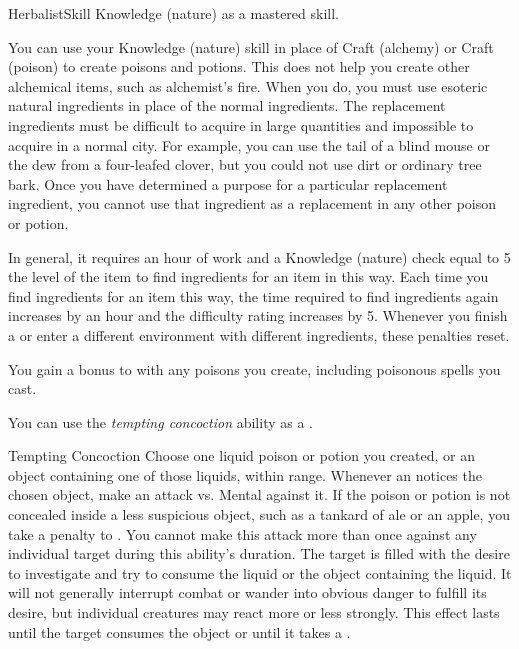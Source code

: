     \begin{feat}{Herbalist}{Skill}
        \featpre Knowledge (nature) as a mastered skill.

         You can use your Knowledge (nature) skill in place of Craft (alchemy) or Craft (poison) to create poisons and potions.
        This does not help you create other alchemical items, such as alchemist's fire.
        When you do, you must use esoteric natural ingredients in place of the normal ingredients.
        The replacement ingredients must be difficult to acquire in large quantities and impossible to acquire in a normal city.
        For example, you can use the tail of a blind mouse or the dew from a four-leafed clover, but you could not use dirt or ordinary tree bark.
        Once you have determined a purpose for a particular replacement ingredient, you cannot use that ingredient as a replacement in any other poison or potion.

        In general, it requires an hour of work and a Knowledge (nature) check equal to 5 \add the level of the item to find ingredients for an item in this way.
        Each time you find ingredients for an item this way, the time required to find ingredients again increases by an hour and the difficulty rating increases by 5.
        Whenever you finish a  or enter a different environment with different ingredients, these penalties reset.

         You gain a  bonus to  with any poisons you create, including poisonous spells you cast.

         You can use the \textit{tempting concoction} ability as a .
        \begin{attuneability}{Tempting Concoction}
            \rankline
            Choose one liquid poison or potion you created, or an object containing one of those liquids, within \rngshort range.
            Whenever an  notices the chosen object, make an attack vs. Mental against it.
            If the poison or potion is not concealed inside a less suspicious object, such as a tankard of ale or an apple, you take a  penalty to .
            You cannot make this attack more than once against any individual target during this ability's duration.
            \hit The target is filled with the desire to investigate and try to consume the liquid or the object containing the liquid.
            It will not generally interrupt combat or wander into obvious danger to fulfill its desire, but individual creatures may react more or less strongly.
            This effect lasts until the target consumes the object or until it takes a .


\end{attuneability}
\end{feat}
